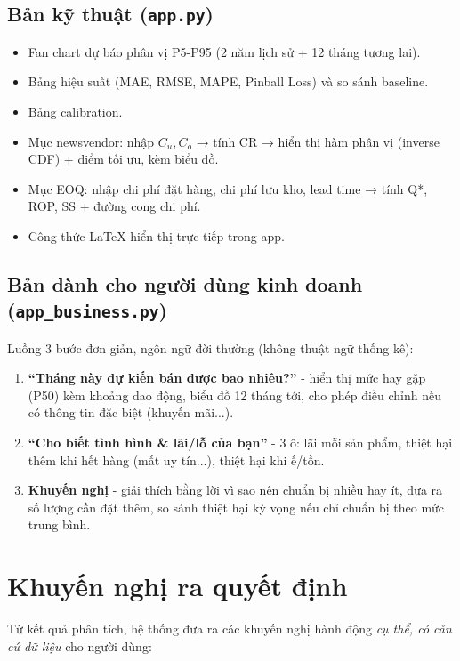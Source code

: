 \documentclass[12pt, a4paper]{report}
\newcommand{\Cu}{\ensuremath{C_u}}
\newcommand{\Co}{\ensuremath{C_o}}
\begin{document}
\subsection{Bản kỹ thuật (\texttt{app.py})}

\begin{itemize}
  \item Fan chart dự báo phân vị P5-P95 (2 năm lịch sử + 12 tháng tương lai).
  \item Bảng hiệu suất (MAE, RMSE, MAPE, Pinball Loss) và so sánh baseline.
  \item Bảng calibration.
  \item Mục newsvendor: nhập $\Cu, \Co$ → tính CR → hiển thị hàm phân vị (inverse CDF) + điểm tối ưu, kèm biểu đồ.
  \item Mục EOQ: nhập chi phí đặt hàng, chi phí lưu kho, lead time → tính Q*, ROP, SS + đường cong chi phí.
  \item Công thức LaTeX hiển thị trực tiếp trong app.
\end{itemize}

\subsection{Bản dành cho người dùng kinh doanh (\texttt{app\_business.py})}

Luồng 3 bước đơn giản, ngôn ngữ đời thường (không thuật ngữ thống kê):

\begin{enumerate}
  \item \textbf{``Tháng này dự kiến bán được bao nhiêu?''} - hiển thị mức hay gặp (P50) kèm khoảng dao động, biểu đồ 12 tháng tới, cho phép điều chỉnh nếu có thông tin đặc biệt (khuyến mãi...).
  \item \textbf{``Cho biết tình hình \& lãi/lỗ của bạn''} - 3 ô: lãi mỗi sản phẩm, thiệt hại thêm khi hết hàng (mất uy tín...), thiệt hại khi ế/tồn.
  \item \textbf{Khuyến nghị} - giải thích bằng lời vì sao nên chuẩn bị nhiều hay ít, đưa ra số lượng cần đặt thêm, so sánh thiệt hại kỳ vọng nếu chỉ chuẩn bị theo mức trung bình.
\end{enumerate}

\section{Khuyến nghị ra quyết định}
\label{ch:khuyennghi}

Từ kết quả phân tích, hệ thống đưa ra các khuyến nghị hành động \textit{cụ thể, có căn cứ dữ liệu} cho người dùng:
\end{document}
